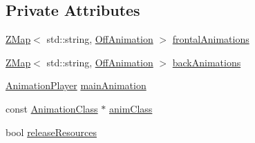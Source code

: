\subsection*{Private Attributes}
\begin{DoxyCompactItemize}
\item 
\hyperlink{namespaceZeta_a9af2e12c4e432d2a1725f19e5a648a04}{Z\+Map}$<$ std\+::string, \hyperlink{classZeta_1_1OffAnimation}{Off\+Animation} $>$ \hyperlink{classZeta_1_1AnimationHandler_acac6efc040935b01a3c1705c2b9ed9a0}{frontal\+Animations}
\item 
\hyperlink{namespaceZeta_a9af2e12c4e432d2a1725f19e5a648a04}{Z\+Map}$<$ std\+::string, \hyperlink{classZeta_1_1OffAnimation}{Off\+Animation} $>$ \hyperlink{classZeta_1_1AnimationHandler_a7bc18188974f6605cb89466cd5677155}{back\+Animations}
\item 
\hyperlink{classZeta_1_1AnimationPlayer}{Animation\+Player} \hyperlink{classZeta_1_1AnimationHandler_a309fc74c793ad1b479c45bbe646c7a65}{main\+Animation}
\item 
const \hyperlink{classZeta_1_1AnimationClass}{Animation\+Class} $\ast$ \hyperlink{classZeta_1_1AnimationHandler_a7b87046e8ddd604eaba79f49a2ee3de5}{anim\+Class}
\item 
bool \hyperlink{classZeta_1_1AnimationHandler_a8d3b5145dbc58320cbf903810be8166e}{release\+Resources}
\end{DoxyCompactItemize}


